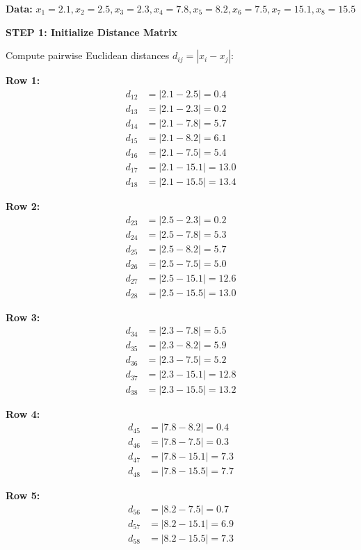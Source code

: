 \documentclass[12pt]{article}
\begin{document}
\begin{solution}

\textbf{Data:} $x_1 = 2.1, x_2 = 2.5, x_3 = 2.3, x_4 = 7.8, x_5 = 8.2, x_6 = 7.5, x_7 = 15.1, x_8 = 15.5$

\textbf{STEP 1: Initialize Distance Matrix}

Compute pairwise Euclidean distances $d_{ij} = |x_i - x_j|$:

\textbf{Row 1:}
\begin{align*}
d_{12} &= |2.1 - 2.5| = 0.4 \\
d_{13} &= |2.1 - 2.3| = 0.2 \\
d_{14} &= |2.1 - 7.8| = 5.7 \\
d_{15} &= |2.1 - 8.2| = 6.1 \\
d_{16} &= |2.1 - 7.5| = 5.4 \\
d_{17} &= |2.1 - 15.1| = 13.0 \\
d_{18} &= |2.1 - 15.5| = 13.4
\end{align*}

\textbf{Row 2:}
\begin{align*}
d_{23} &= |2.5 - 2.3| = 0.2 \\
d_{24} &= |2.5 - 7.8| = 5.3 \\
d_{25} &= |2.5 - 8.2| = 5.7 \\
d_{26} &= |2.5 - 7.5| = 5.0 \\
d_{27} &= |2.5 - 15.1| = 12.6 \\
d_{28} &= |2.5 - 15.5| = 13.0
\end{align*}

\textbf{Row 3:}
\begin{align*}
d_{34} &= |2.3 - 7.8| = 5.5 \\
d_{35} &= |2.3 - 8.2| = 5.9 \\
d_{36} &= |2.3 - 7.5| = 5.2 \\
d_{37} &= |2.3 - 15.1| = 12.8 \\
d_{38} &= |2.3 - 15.5| = 13.2
\end{align*}

\textbf{Row 4:}
\begin{align*}
d_{45} &= |7.8 - 8.2| = 0.4 \\
d_{46} &= |7.8 - 7.5| = 0.3 \\
d_{47} &= |7.8 - 15.1| = 7.3 \\
d_{48} &= |7.8 - 15.5| = 7.7
\end{align*}

\textbf{Row 5:}
\begin{align*}
d_{56} &= |8.2 - 7.5| = 0.7 \\
d_{57} &= |8.2 - 15.1| = 6.9 \\
d_{58} &= |8.2 - 15.5| = 7.3
\end{align*}


\end{solution}
\end{document}
